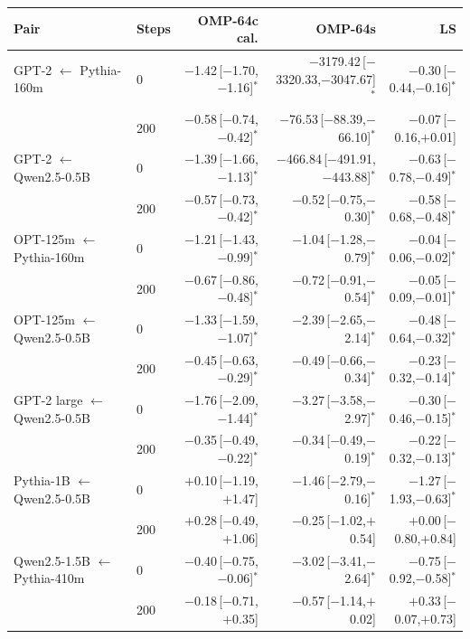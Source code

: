\begin{tabular}{llrrr}
\toprule
Pair & Steps & OMP-64c cal. & OMP-64s & LS \\
\midrule
GPT-2 $\leftarrow$ Pythia-160m & 0 & $-$1.42\,[$-$1.70,$-$1.16]$^{*}$ & $-$3179.42\,[$-$3320.33,$-$3047.67]$^{*}$ & $-$0.30\,[$-$0.44,$-$0.16]$^{*}$ \\
 & 200 & $-$0.58\,[$-$0.74,$-$0.42]$^{*}$ & $-$76.53\,[$-$88.39,$-$66.10]$^{*}$ & $-$0.07\,[$-$0.16,$+$0.01] \\
\addlinespace
GPT-2 $\leftarrow$ Qwen2.5-0.5B & 0 & $-$1.39\,[$-$1.66,$-$1.13]$^{*}$ & $-$466.84\,[$-$491.91,$-$443.88]$^{*}$ & $-$0.63\,[$-$0.78,$-$0.49]$^{*}$ \\
 & 200 & $-$0.57\,[$-$0.73,$-$0.42]$^{*}$ & $-$0.52\,[$-$0.75,$-$0.30]$^{*}$ & $-$0.58\,[$-$0.68,$-$0.48]$^{*}$ \\
\addlinespace
OPT-125m $\leftarrow$ Pythia-160m & 0 & $-$1.21\,[$-$1.43,$-$0.99]$^{*}$ & $-$1.04\,[$-$1.28,$-$0.79]$^{*}$ & $-$0.04\,[$-$0.06,$-$0.02]$^{*}$ \\
 & 200 & $-$0.67\,[$-$0.86,$-$0.48]$^{*}$ & $-$0.72\,[$-$0.91,$-$0.54]$^{*}$ & $-$0.05\,[$-$0.09,$-$0.01]$^{*}$ \\
\addlinespace
OPT-125m $\leftarrow$ Qwen2.5-0.5B & 0 & $-$1.33\,[$-$1.59,$-$1.07]$^{*}$ & $-$2.39\,[$-$2.65,$-$2.14]$^{*}$ & $-$0.48\,[$-$0.64,$-$0.32]$^{*}$ \\
 & 200 & $-$0.45\,[$-$0.63,$-$0.29]$^{*}$ & $-$0.49\,[$-$0.66,$-$0.34]$^{*}$ & $-$0.23\,[$-$0.32,$-$0.14]$^{*}$ \\
\addlinespace
GPT-2 large $\leftarrow$ Qwen2.5-0.5B & 0 & $-$1.76\,[$-$2.09,$-$1.44]$^{*}$ & $-$3.27\,[$-$3.58,$-$2.97]$^{*}$ & $-$0.30\,[$-$0.46,$-$0.15]$^{*}$ \\
 & 200 & $-$0.35\,[$-$0.49,$-$0.22]$^{*}$ & $-$0.34\,[$-$0.49,$-$0.19]$^{*}$ & $-$0.22\,[$-$0.32,$-$0.13]$^{*}$ \\
\addlinespace
Pythia-1B $\leftarrow$ Qwen2.5-0.5B & 0 & $+$0.10\,[$-$1.19,$+$1.47] & $-$1.46\,[$-$2.79,$-$0.16]$^{*}$ & $-$1.27\,[$-$1.93,$-$0.63]$^{*}$ \\
 & 200 & $+$0.28\,[$-$0.49,$+$1.06] & $-$0.25\,[$-$1.02,$+$0.54] & $+$0.00\,[$-$0.80,$+$0.84] \\
\addlinespace
Qwen2.5-1.5B $\leftarrow$ Pythia-410m & 0 & $-$0.40\,[$-$0.75,$-$0.06]$^{*}$ & $-$3.02\,[$-$3.41,$-$2.64]$^{*}$ & $-$0.75\,[$-$0.92,$-$0.58]$^{*}$ \\
 & 200 & $-$0.18\,[$-$0.71,$+$0.35] & $-$0.57\,[$-$1.14,$+$0.02] & $+$0.33\,[$-$0.07,$+$0.73] \\
\bottomrule
\end{tabular}
